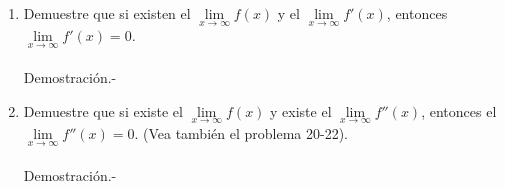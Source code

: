 \begin{enumerate}[\bfseries 1.]
\begin{enumerate}
	    \item Demuestre que si existen el $\lim\limits_{x\to \infty} f(x)$ y el $\lim\limits_{x\to \infty}f'(x)$, entonces $\lim\limits_{x\to \infty}f'(x)=0$.\\\\
		Demostración.-\; 

	    \item Demuestre que si existe el $\lim\limits_{x\to \infty}f(x)$ y existe el $\lim\limits_{x\to \infty} f''(x)$, entonces el $\lim\limits_{x\to \infty}f''(x)=0$. (Vea también el problema 20-22).\\\\
		Demostración.-\;

	\end{enumerate}

\end{enumerate}

